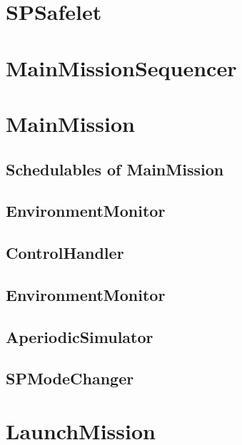 \documentclass[10pt,a4paper,final]{article}
\begin{document}
\section{SPSafelet}

\newpage

\section{MainMissionSequencer}

\newpage

\section{MainMission}

\newpage

\subsection{Schedulables of MainMission}

\subsection{EnvironmentMonitor}

\newpage

\subsection{ControlHandler}

\newpage

\subsection{EnvironmentMonitor}

\newpage

\subsection{AperiodicSimulator}

\newpage

\subsection{SPModeChanger}

\newpage

\section{LaunchMission}

\newpage
\end{document}
